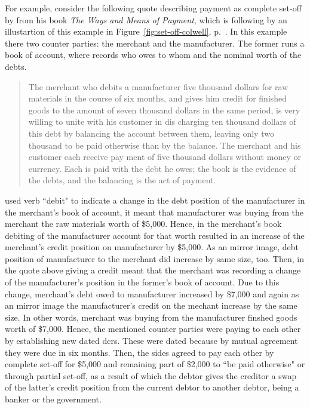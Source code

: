 For example, consider the following quote describing payment as complete set-off by \citeauthor{colwell1859} from his book \textit{The Ways and Means of Payment}, which is following by an illustartion of this example in Figure~\ref{fig:set-off-colwell}, p.~\pageref{fig:set-off-colwell}. In this example there two counter parties: the merchant and the manufacturer. The former runs a book of account, where records who owes to whom and the nominal worth of the debts. 

\begin{quote}
The merchant who debits a manufacturer five thousand dollars for raw materials in the course of six months, and gives him credit for finished goods to the amount of seven thousand dollars in the same period, is very willing to unite with his customer in dis charging ten thousand dollars of this debt by balancing the account between them, leaving only two thousand to be paid otherwise than by the balance. The merchant and his customer each receive pay ment of five thousand dollars without money or currency. Each is paid with the debt he owes; the book is the evidence of the debts, and the balancing is the act of payment.~\citep[pp.~8-9]{colwell1859}
\end{quote}

\citeauthor{colwell1859} used verb ``debit" to indicate a change in the debt position of the manufacturer in the merchant's book of account, it meant that manufacturer was buying from the merchant the raw materials worth of \$5,000. Hence, in the merchant's book debiting of the manufacturer account for that worth resulted in an increase of the merchant's credit position on manufacturer by \$5,000. As an mirror image, debt position of manufacturer to the merchant did increase by same size, too. Then, in the quote above giving a credit meant that the merchant was recording a change of the manufacturer's position in the former's book of account. Due to this change, merchant's debt owed to manufacturer increased by \$7,000 and again as an mirror image the manufacturer's credit on the mechant increase by the same size. In other words, merchant was buying from the manufacturer finshed goods worth of \$7,000. Hence, the mentioned counter parties were paying to each other by establishing new dated \acfp{dcr}. These were dated because by mutual agreement they were due in six months. Then, the sides agreed to pay each other by complete set-off for \$5,000 and remaining part of \$2,000 to ``be paid otherwise" or through partial set-off, as a result of which the debtor gives the creditor a swap of the latter's credit position from the current debtor to another debtor, being a banker or the government. 

